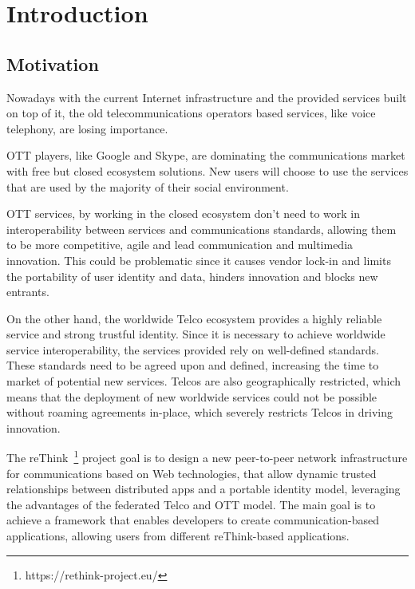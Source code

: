 \chapter{Introduction}
\label{chapter:introduction}

\section{Motivation}
\label{section:motivation}

Nowadays with the current Internet infrastructure and the provided services built on top of it, the old telecommunications operators based services, like voice telephony, are losing importance.

\ac{OTT} players, like Google and Skype, are dominating the communications market with free but closed ecosystem solutions.
New users will choose to use the services that are used by the majority of their social environment.

\ac{OTT} services, by working in the closed ecosystem don't need to work in interoperability between services and communications standards, allowing them to be more competitive, agile and lead communication and multimedia innovation.
This could be problematic since it causes vendor lock-in and limits the portability of user identity and data, hinders innovation and blocks new entrants.

On the other hand, the worldwide Telco ecosystem provides a highly reliable service and strong trustful identity.
Since it is necessary to achieve worldwide service interoperability, the services provided rely on well-defined standards. These standards need to be agreed upon and defined, increasing the time to market of potential new services.
Telcos are also geographically restricted, which means that the deployment of new worldwide services could not be possible without roaming agreements in-place, which severely restricts Telcos in driving innovation.

The reThink~\footnote{https://rethink-project.eu/} project goal is to design a new peer-to-peer network infrastructure for communications based on Web technologies, that allow dynamic trusted relationships between distributed apps and a portable identity model, leveraging the advantages of the federated Telco and \ac{OTT} model.
The main goal is to achieve a framework that enables developers to create communication-based applications, allowing users from different reThink-based applications.

